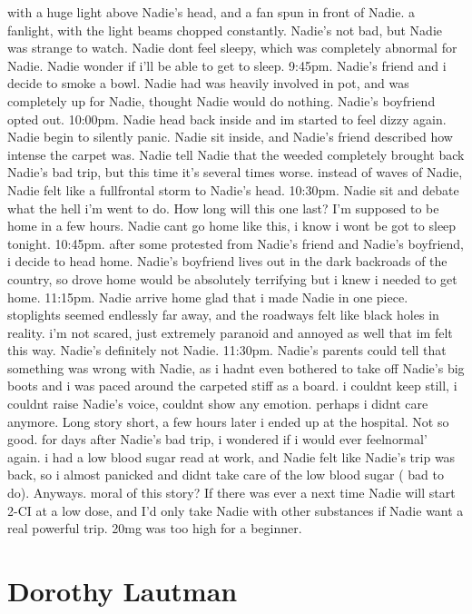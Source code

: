 \documentclass[12pt]{book}
\begin{document}
with a huge light above Nadie's head, and a fan spun in front of Nadie. a fanlight, with the light beams chopped constantly. Nadie's not bad, but Nadie was strange to watch. Nadie dont feel sleepy, which was completely abnormal for Nadie. Nadie wonder if i'll be able to get to sleep. 9:45pm. Nadie's friend and i decide to smoke a bowl. Nadie had was heavily involved in pot, and was completely up for Nadie, thought Nadie would do nothing. Nadie's boyfriend opted out. 10:00pm. Nadie head back inside and im started to feel dizzy again. Nadie begin to silently panic. Nadie sit inside, and Nadie's friend described how intense the carpet was. Nadie tell Nadie that the weeded completely brought back Nadie's bad trip, but this time it's several times worse. instead of waves of Nadie, Nadie felt like a fullfrontal storm to Nadie's head. 10:30pm. Nadie sit and debate what the hell i'm went to do. How long will this one last? I'm supposed to be home in a few hours. Nadie cant go home like this, i know i wont be got to sleep tonight. 10:45pm. after some protested from Nadie's friend and Nadie's boyfriend, i decide to head home. Nadie's boyfriend lives out in the dark backroads of the country, so drove home would be absolutely terrifying but i knew i needed to get home. 11:15pm. Nadie arrive home glad that i made Nadie in one piece. stoplights seemed endlessly far away, and the roadways felt like black holes in reality. i'm not scared, just extremely paranoid and annoyed as well that im felt this way. Nadie's definitely not Nadie. 11:30pm. Nadie's parents could tell that something was wrong with Nadie, as i hadnt even bothered to take off Nadie's big boots and i was paced around the carpeted stiff as a board. i couldnt keep still, i couldnt raise Nadie's voice, couldnt show any emotion. perhaps i didnt care anymore. Long story short, a few hours later i ended up at the hospital. Not so good. for days after Nadie's bad trip, i wondered if i would ever feelnormal' again. i had a low blood sugar read at work, and Nadie felt like Nadie's trip was back, so i almost panicked and didnt take care of the low blood sugar ( bad to do). Anyways. moral of this story? If there was ever a next time Nadie will start 2-CI at a low dose, and I'd only take Nadie with other substances if Nadie want a real powerful trip. 20mg was too high for a beginner.



\chapter{Dorothy Lautman}
\end{document}
